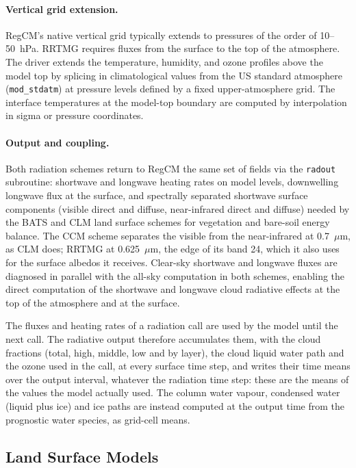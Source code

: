 \paragraph{Vertical grid extension.}
RegCM's native vertical grid typically extends to pressures of the order of
10--50~hPa.  RRTMG requires fluxes from the surface to the top of the
atmosphere.  The driver extends the temperature, humidity, and ozone profiles
above the model top by splicing in climatological values from the US standard
atmosphere (\texttt{mod\_stdatm}) at pressure levels defined by a fixed
upper-atmosphere grid.  The interface temperatures at the model-top boundary
are computed by interpolation in sigma or pressure coordinates.

\paragraph{Output and coupling.}
Both radiation schemes return to RegCM the same set of fields via the
\texttt{radout} subroutine: shortwave and longwave heating rates on model
levels, downwelling longwave flux at the surface, and spectrally separated
shortwave surface components (visible direct and diffuse, near-infrared
direct and diffuse) needed by the BATS and CLM land surface schemes for
vegetation and bare-soil energy balance.  The CCM scheme separates the
visible from the near-infrared at 0.7~$\mu$m, as CLM does; RRTMG at
0.625~$\mu$m, the edge of its band 24, which it also uses for the surface
albedos it receives.  Clear-sky shortwave and longwave fluxes are
diagnosed in parallel with the all-sky computation in both schemes, enabling
the direct computation of the shortwave and longwave cloud radiative effects
at the top of the atmosphere and at the surface.

The fluxes and heating rates of a radiation call are used by the model
until the next call.  The radiative output therefore accumulates them, with
the cloud fractions (total, high, middle, low and by layer), the cloud
liquid water path and the ozone used in the call, at every surface time
step, and writes their time means
over the output interval, whatever the radiation time step: these are the
means of the values the model actually used.  The column water vapour,
condensed water (liquid plus ice) and ice paths are instead computed at the
output time from the prognostic water species, as grid-cell means.

\subsection{Land Surface Models}

